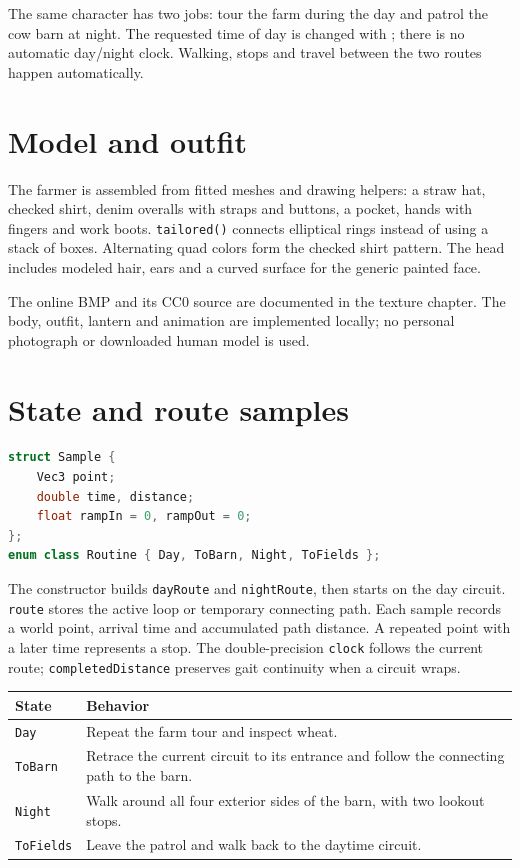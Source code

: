 \documentclass[11pt,a4paper,openany]{book}
\newcommand{\code}[1]{\texttt{#1}}
\newcommand{\keycap}[1]{\begingroup\setlength{\fboxsep}{0.8pt}\raisebox{0.05ex}{\fbox{\footnotesize\texttt{#1}}}\endgroup}
\begin{document}
\begin{beginnerbox}
	The same character has two jobs: tour the farm during the day and patrol the cow barn at night. The requested time of day is changed with \keycap{N}; there is no automatic day/night clock. Walking, stops and travel between the two routes happen automatically.
\end{beginnerbox}

\section{Model and outfit}
The farmer is assembled from fitted meshes and drawing helpers: a straw hat, checked shirt, denim overalls with straps and buttons, a pocket, hands with fingers and work boots. \code{tailored()} connects elliptical rings instead of using a stack of boxes. Alternating quad colors form the checked shirt pattern. The head includes modeled hair, ears and a curved surface for the generic painted face.

The online BMP and its CC0 source are documented in the texture chapter. The body, outfit, lantern and animation are implemented locally; no personal photograph or downloaded human model is used.

\section{State and route samples}
\begin{lstlisting}[language=C++]
struct Sample {
    Vec3 point;
    double time, distance;
    float rampIn = 0, rampOut = 0;
};
enum class Routine { Day, ToBarn, Night, ToFields };
\end{lstlisting}

The constructor builds \code{dayRoute} and \code{nightRoute}, then starts on the day circuit. \code{route} stores the active loop or temporary connecting path. Each sample records a world point, arrival time and accumulated path distance. A repeated point with a later time represents a stop. The double-precision \code{clock} follows the current route; \code{completedDistance} preserves gait continuity when a circuit wraps.

\begin{longtable}{@{}p{}p{}@{}}
	\toprule
	State & Behavior \\
	\midrule
	\endhead
	\code{Day} & Repeat the farm tour and inspect wheat. \\
	\code{ToBarn} & Retrace the current circuit to its entrance and follow the connecting path to the barn. \\
	\code{Night} & Walk around all four exterior sides of the barn, with two lookout stops. \\
	\code{ToFields} & Leave the patrol and walk back to the daytime circuit. \\
	\bottomrule
\end{longtable}
\end{document}
